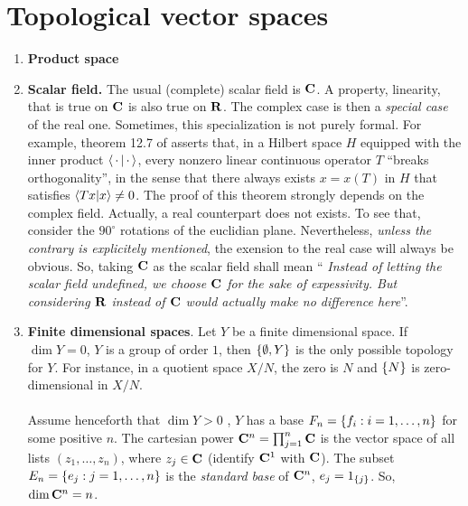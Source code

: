 \section{Topological vector spaces}
\begin{enumerate}
\item{{\bf Product space}}
\item{{\bf Scalar field.} The usual (complete) scalar field is ${\mathbf C}$. %
A property, \eg linearity, that is true on ${\mathbf C}$ is also true on ${\mathbf R}$. %
The complex case is then a {\it special case} of the real one. %
Sometimes, this specialization is not purely formal. %
For example, theorem 12.7 of \cite{FA} asserts that, in a Hilbert space $H$ %
equipped with the inner product $\bra{\,\cdot\,}\ket{\,\cdot\,}$, %
every nonzero linear continuous operator $T$ ``breaks orthogonality'', %
in the sense that there always exists $x=x(T)$ in $H$ that satisfies %
%
$\bra{Tx}\ket{x} \neq 0$. %
%
The proof of this theorem strongly depends on the complex field. %
Actually, a real counterpart does not exists. %
To see that, consider the $90^\circ$ rotations of the euclidian plane. %
%
Nevertheless, {\it unless the contrary is explicitely mentioned}, %
the exension to the real case will always be obvious. %
So, taking ${\mathbf C}$ as the scalar field shall mean %
%
``{\it %
Instead of letting the scalar field undefined, we choose ${\mathbf C}$ for the sake of %
expessivity. But considering ${\mathbf R}$ instead of %
${\mathbf C}$ would actually make no difference here}''. %
%
}
\item{{\bf Finite dimensional spaces}. %
Let $Y$ be a finite dimensional space. %
If $\dim Y = 0$, \ie  %
%
$Y$ is a group of order $1$,  %
then $\{\emptyset, Y\}$ is the only possible topology for $Y$. %
%
For instance, in a quotient space $X/N$, %
the zero is $N$ and $\{N\}$ is zero-dimensional in $X/N$. %
%
\\
\\\noindent
Assume henceforth that $\dim Y > 0$ , \ie $Y$ has a base %
%
$F_n = \{f_i: i= 1,\dots, n\}$ for some positive $n$. %
%
%
The cartesian power ${\mathbf C}^n  = \prod_{j=1}^{n} {\mathbf C}$ is %
the vector space of all lists %
%
$(z_1, \dots, z_n)$, where $z_j\in {\mathbf C}$ %
%
(identify ${\mathbf C}^1$ with ${\mathbf C}$). %
The subset %
%
$E_n = \{e_j: j=1, \dots, n\}$ %
%
is the {\it standard base} of ${\mathbf C}^n$, \ie $e_j = 1_{\{j\}}$. %
So, %
%
$\dim {\mathbf C}^n = n$. %
}
\end{enumerate}
